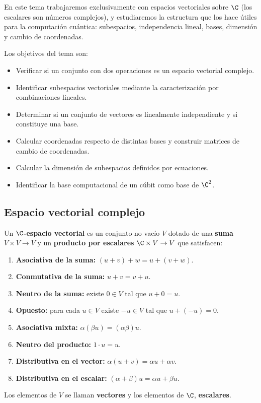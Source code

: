 En este tema trabajaremos exclusivamente con espacios vectoriales sobre $\C$ (los escalares son números complejos), y estudiaremos la estructura que los hace útiles para la computación cuántica: subespacios, independencia lineal, bases, dimensión y cambio de coordenadas.

Los objetivos del tema son:

\begin{itemize}
  \item Verificar si un conjunto con dos operaciones es un espacio vectorial complejo.
  \item Identificar subespacios vectoriales mediante la caracterización por combinaciones lineales.
  \item Determinar si un conjunto de vectores es linealmente independiente y si constituye una base.
  \item Calcular coordenadas respecto de distintas bases y construir matrices de cambio de coordenadas.
  \item Calcular la dimensión de subespacios definidos por ecuaciones.
  \item Identificar la base computacional de un cúbit como base de $\C^2$.
\end{itemize}

\subsection{Espacio vectorial complejo}

\begin{defi}
  \label{def:espacio-vectorial}
  Un \textbf{$\C$-espacio vectorial} es un conjunto no vacío $V$ dotado de una \textbf{suma} $V\times V\to V$ y un \textbf{producto por escalares} $\C\times V\to V$ que satisfacen:
  \begin{enumerate}
    \item[\likeitem{E1}] \textbf{Asociativa de la suma:} $(u+v)+w = u+(v+w)$.
    \item[\likeitem{E2}] \textbf{Conmutativa de la suma:} $u+v = v+u$.
    \item[\likeitem{E3}] \textbf{Neutro de la suma:} existe $0\in V$ tal que $u+0=u$.
    \item[\likeitem{E4}] \textbf{Opuesto:} para cada $u\in V$ existe $-u\in V$ tal que $u+(-u)=0$.
    \item[\likeitem{E5}] \textbf{Asociativa mixta:} $\alpha(\beta u)=(\alpha\beta)u$.
    \item[\likeitem{E6}] \textbf{Neutro del producto:} $1\cdot u = u$.
    \item[\likeitem{E7}] \textbf{Distributiva en el vector:} $\alpha(u+v)=\alpha u+\alpha v$.
    \item[\likeitem{E8}] \textbf{Distributiva en el escalar:} $(\alpha+\beta)u=\alpha u+\beta u$.
  \end{enumerate}
  Los elementos de $V$ se llaman \textbf{vectores} y los elementos de $\C$, \textbf{escalares}.
\end{defi}

